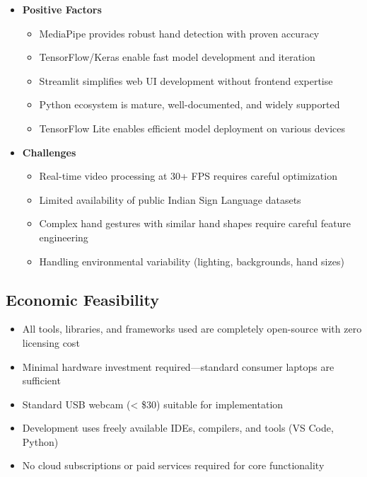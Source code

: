 \begin{itemize}
    \item \textbf{Positive Factors}
    \begin{itemize}
        \item MediaPipe provides robust hand detection with proven accuracy
        \item TensorFlow/Keras enable fast model development and iteration
        \item Streamlit simplifies web UI development without frontend expertise
        \item Python ecosystem is mature, well-documented, and widely supported
        \item TensorFlow Lite enables efficient model deployment on various devices
    \end{itemize}
    
    \item \textbf{Challenges}
    \begin{itemize}
        \item Real-time video processing at 30+ FPS requires careful optimization
        \item Limited availability of public Indian Sign Language datasets
        \item Complex hand gestures with similar hand shapes require careful feature engineering
        \item Handling environmental variability (lighting, backgrounds, hand sizes)
    \end{itemize}
\end{itemize}

\subsection{Economic Feasibility}

\begin{itemize}
    \item All tools, libraries, and frameworks used are completely open-source with zero licensing cost
    \item Minimal hardware investment required—standard consumer laptops are sufficient
    \item Standard USB webcam (< \$30) suitable for implementation
    \item Development uses freely available IDEs, compilers, and tools (VS Code, Python)
    \item No cloud subscriptions or paid services required for core functionality
\end{itemize}

